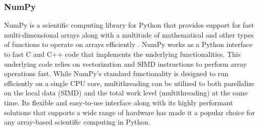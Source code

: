 \subsubsection{NumPy} \label{background:implementation_tools_and_libraries:numpy}
NumPy is a scientific computing library for Python that provides support for fast multi-dimensional arrays along with a multitude of mathematical and other types of functions to operate on arrays efficiently \cite{numpy}.
NumPy works as a Python interface to fast C and C++ code that implements the underlying functionalities.
This underlying code relies on vectorization and SIMD instructions to perform array operations fast. 
While NumPy's standard functionality is designed to run efficiently on a single CPU core, multithreading can be utilized to both parellalize on the local data (SIMD) and the total work level (multithreading) at the same time.
Its flexible and easy-to-use interface along with its highly performant solutions that supports a wide range of hardware has made it a popular choice for any array-based scientific computing in Python.

